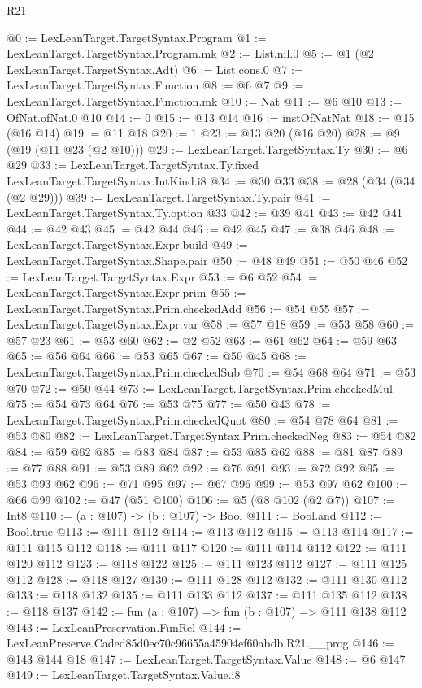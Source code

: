 \begin{lexlean}{R21}
\begin{coremodule}
@0 := LexLeanTarget.TargetSyntax.Program
@1 := LexLeanTarget.TargetSyntax.Program.mk
@2 := List.nil.{0}
@5 := @1 (@2 LexLeanTarget.TargetSyntax.Adt)
@6 := List.cons.{0}
@7 := LexLeanTarget.TargetSyntax.Function
@8 := @6 @7
@9 := LexLeanTarget.TargetSyntax.Function.mk
@10 := Nat
@11 := @6 @10
@13 := OfNat.ofNat.{0} @10
@14 := 0
@15 := @13 @14
@16 := instOfNatNat
@18 := @15 (@16 @14)
@19 := @11 @18
@20 := 1
@23 := @13 @20 (@16 @20)
@28 := @9 (@19 (@11 @23 (@2 @10)))
@29 := LexLeanTarget.TargetSyntax.Ty
@30 := @6 @29
@33 := LexLeanTarget.TargetSyntax.Ty.fixed LexLeanTarget.TargetSyntax.IntKind.i8
@34 := @30 @33
@38 := @28 (@34 (@34 (@2 @29)))
@39 := LexLeanTarget.TargetSyntax.Ty.pair
@41 := LexLeanTarget.TargetSyntax.Ty.option @33
@42 := @39 @41
@43 := @42 @41
@44 := @42 @43
@45 := @42 @44
@46 := @42 @45
@47 := @38 @46
@48 := LexLeanTarget.TargetSyntax.Expr.build
@49 := LexLeanTarget.TargetSyntax.Shape.pair
@50 := @48 @49
@51 := @50 @46
@52 := LexLeanTarget.TargetSyntax.Expr
@53 := @6 @52
@54 := LexLeanTarget.TargetSyntax.Expr.prim
@55 := LexLeanTarget.TargetSyntax.Prim.checkedAdd
@56 := @54 @55
@57 := LexLeanTarget.TargetSyntax.Expr.var
@58 := @57 @18
@59 := @53 @58
@60 := @57 @23
@61 := @53 @60
@62 := @2 @52
@63 := @61 @62
@64 := @59 @63
@65 := @56 @64
@66 := @53 @65
@67 := @50 @45
@68 := LexLeanTarget.TargetSyntax.Prim.checkedSub
@70 := @54 @68 @64
@71 := @53 @70
@72 := @50 @44
@73 := LexLeanTarget.TargetSyntax.Prim.checkedMul
@75 := @54 @73 @64
@76 := @53 @75
@77 := @50 @43
@78 := LexLeanTarget.TargetSyntax.Prim.checkedQuot
@80 := @54 @78 @64
@81 := @53 @80
@82 := LexLeanTarget.TargetSyntax.Prim.checkedNeg
@83 := @54 @82
@84 := @59 @62
@85 := @83 @84
@87 := @53 @85 @62
@88 := @81 @87
@89 := @77 @88
@91 := @53 @89 @62
@92 := @76 @91
@93 := @72 @92
@95 := @53 @93 @62
@96 := @71 @95
@97 := @67 @96
@99 := @53 @97 @62
@100 := @66 @99
@102 := @47 (@51 @100)
@106 := @5 (@8 @102 (@2 @7))
@107 := Int8
@110 := (a : @107) -> (b : @107) -> Bool
@111 := Bool.and
@112 := Bool.true
@113 := @111 @112
@114 := @113 @112
@115 := @113 @114
@117 := @111 @115 @112
@118 := @111 @117
@120 := @111 @114 @112
@122 := @111 @120 @112
@123 := @118 @122
@125 := @111 @123 @112
@127 := @111 @125 @112
@128 := @118 @127
@130 := @111 @128 @112
@132 := @111 @130 @112
@133 := @118 @132
@135 := @111 @133 @112
@137 := @111 @135 @112
@138 := @118 @137
@142 := fun (a : @107) => fun (b : @107) => @111 @138 @112
@143 := LexLeanPreservation.FunRel
@144 := LexLeanPreserve.Caded85d0ec70c96655a45904ef60abdb.R21.__prog
@146 := @143 @144 @18
@147 := LexLeanTarget.TargetSyntax.Value
@148 := @6 @147
@149 := LexLeanTarget.TargetSyntax.Value.i8

\end{coremodule}
\end{lexlean}
